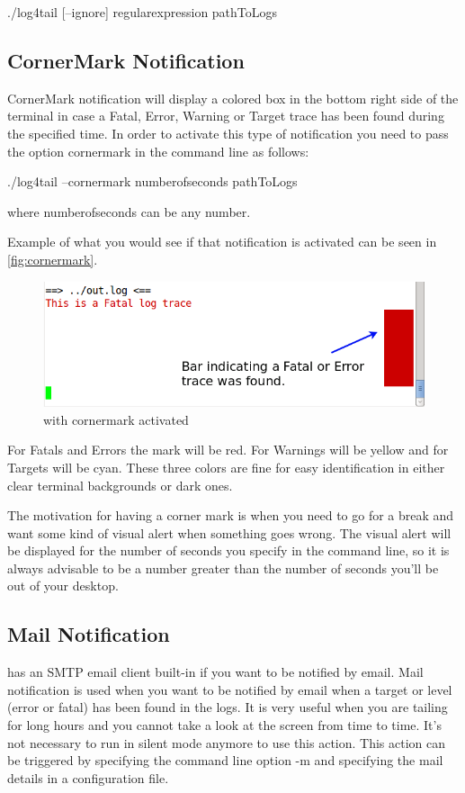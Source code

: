 \begin{cmd}
  ./log4tail [--ignore] regularexpression pathToLogs
\end{cmd}


\subsection{CornerMark Notification}
\label{sec:cornermark}
CornerMark notification will display a colored box in the bottom right side of
the terminal in case a Fatal, Error, Warning or Target trace has been found during the specified
time. In order to activate this type of notification you need to pass the
option cornermark in the command line as follows:

\begin{cmd}
  ./log4tail --cornermark numberofseconds pathToLogs
\end{cmd}
where numberofseconds can be any number. 

Example of what you would see if that notification is activated can be seen in
 \autoref{fig:cornermark}.

\begin{figure}[ht]
\centering
\includegraphics[scale=0.60]{terminalcornermark.png}
\caption{\logftailer{} with cornermark activated}\label{fig:cornermark}
\end{figure}

For Fatals and Errors the mark will be red. For Warnings will be yellow and for Targets 
will be cyan. These three colors are fine for easy identification in either clear terminal
backgrounds or dark ones.

The motivation for having a corner mark is when you need to go for a break and
want some kind of visual alert when something goes wrong. The visual alert will
be displayed for the number of seconds you specify in the command line, so it
is always advisable to be a number greater than the number of seconds you'll be
out of your desktop. 

\subsection{Mail Notification}
\label{sec:mailnotification}
\logftailer{} has an SMTP email client built-in if you want to be notified by email.
Mail notification is used when you want to be notified by email when a target or level (error or fatal) has been found 
in the logs. It is very useful when you are tailing for long hours and you cannot take 
a look at the screen from time to time. It's not necessary to run in silent mode anymore 
to use this action.
This action can be triggered by specifying the command line option -m and
specifying the mail details in a configuration file. 

